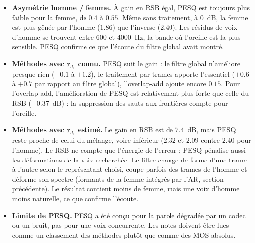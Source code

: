 \begin{interpretation}
\begin{itemize}
  \item \textbf{Asymétrie homme / femme.} À gain en RSB égal, PESQ est toujours plus faible pour la femme, de $0.4$ à $0.55$. Même sans traitement, à $0$~dB, la femme est plus gênée par l'homme ($1.86$) que l'inverse ($2.40$). Les résidus de voix d'homme se trouvent entre $600$ et $4000$~Hz, la bande où l'oreille est la plus sensible. PESQ confirme ce que l'écoute du filtre global avait montré.
  \item \textbf{Méthodes avec $\mathbf{r}_{d_1}$ connu.} PESQ suit le gain : le filtre global n'améliore presque rien ($+0.1$ à $+0.2$), le traitement par trames apporte l'essentiel ($+0.6$ à $+0.7$ par rapport au filtre global), l'overlap-add ajoute encore $0.15$. Pour l'overlap-add, l'amélioration de PESQ est relativement plus forte que celle du RSB ($+0.37$~dB) : la suppression des sauts aux frontières compte pour l'oreille.
  \item \textbf{Méthodes avec $\mathbf{r}_{d_1}$ estimé.} Le gain en RSB est de $7.4$~dB, mais PESQ reste proche de celui du mélange, voire inférieur ($2.32$ et $2.09$ contre $2.40$ pour l'homme). Le RSB ne compte que l'énergie de l'erreur ; PESQ pénalise aussi les déformations de la voix recherchée. Le filtre change de forme d'une trame à l'autre selon le représentant choisi, coupe parfois des trames de l'homme et déforme son spectre (formants de la femme intégrés par l'AR, section précédente). Le résultat contient moins de femme, mais une voix d'homme moins naturelle, ce que confirme l'écoute.
  \item \textbf{Limite de PESQ.} PESQ a été conçu pour la parole dégradée par un codec ou un bruit, pas pour une voix concurrente. Les notes doivent être lues comme un classement des méthodes plutôt que comme des MOS absolus.
\end{itemize}
\end{interpretation}

